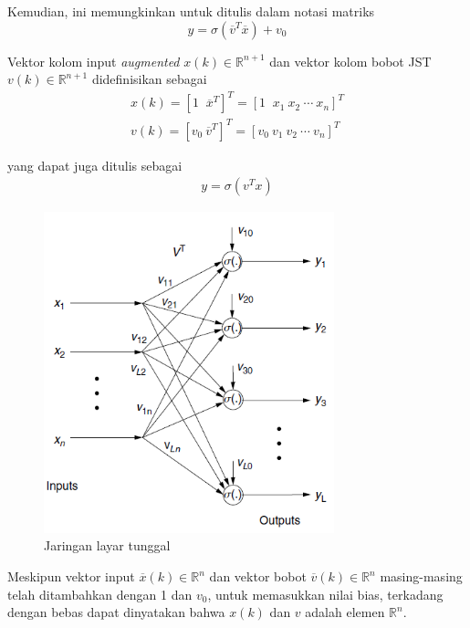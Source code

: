 Kemudian, ini memungkinkan untuk ditulis dalam notasi matriks
\vspace{-1em}
\begin{equation} \label{eq:3:matriksy}
y = \sigma(\overline{v}^T\overline{x}) + v_0
\end{equation}

Vektor kolom input \textit{augmented} $x(k) \in \mathbb{R}^{n+1} $ dan vektor kolom bobot JST $v(k) \in \mathbb{R}^{n+1} $ didefinisikan sebagai
\vspace{-1em}
\begin{equation} \label{eq:3:matriksaugmented}
\begin{split}
x(k) = [1\;\; \overline{x}^T]^T = [1\;\; x_1\ x_2\ \cdots\ x_n]^T \\
v(k) = [v_0\ \overline{v}^T]^T = [v_0\ v_1\ v_2\ \cdots\ v_n]^T
\end{split}
\end{equation}

yang dapat juga ditulis sebagai
\vspace{-2em}
\begin{equation} \label{eq:3:matriksfinal}
\begin{split}
y = \sigma(v^Tx)
\end{split}
\end{equation}

\begin{figure}[!h]
	\centering
	\includegraphics[width=0.75\textwidth]{figures/jstTunggal}
	\caption{Jaringan layar tunggal \cite{NNControlBook}}
	\label{fig:3:jstTunggal}
\end{figure}
Meskipun vektor input $\overline{x}(k) \in \mathbb{R}^n $ dan vektor bobot $\overline{v}(k) \in \mathbb{R}^n $ masing-masing telah ditambahkan dengan 1 dan $v_0$, untuk memasukkan nilai bias, terkadang dengan bebas dapat dinyatakan bahwa $x(k)$ dan $v$ adalah elemen $\mathbb{R}^n$.

